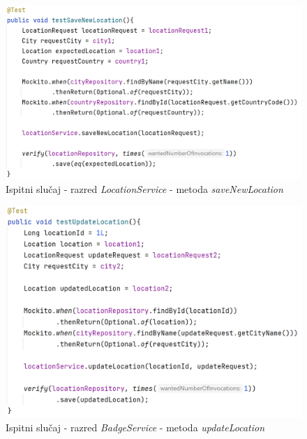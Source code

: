         \begin{figure}[H]
            \includegraphics[scale=0.9]{slike/unit_test_location_save.png} 
              \centering
            \caption{Ispitni slučaj - razred \textit{LocationService} - metoda \textit{saveNewLocation}}
        \end{figure}

        \begin{figure}[H]
            \includegraphics[scale=0.9]{slike/unit_test_location_update.png} 
              \centering
            \caption{Ispitni slučaj - razred \textit{BadgeService} - metoda \textit{updateLocation}}
        \end{figure}

